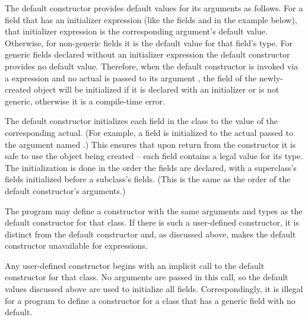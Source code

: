 The default constructor provides default values for its arguments as follows.
For a field that has an initializer expression (like the
fields  and  in the example below), that initializer
expression is the corresponding argument's default value.
Otherwise, for non-generic fields it is the default value for that
field's type.
For generic fields declared without an initializer expression the
default constructor provides no default value.
Therefore, when the default constructor is invoked via a 
expression and no actual is passed to its argument , the
field  of the newly-created object will be initialized if it
is declared with an initializer or is not generic, otherwise it is a
compile-time error.

The default constructor initializes each field in the class to the
value of the corresponding actual. (For example, a field  is
initialized to the actual passed to the argument named .)
This ensures that upon return from the constructor it is safe to use
the object being created -- each field contains a legal value for its type.
The initialization is done in the order the fields are declared, with
a superclass's fields initialized before a subclass's fields.
(This is the same as the order of the default constructor's arguments.)

The program may define a constructor with the same arguments and types
as the default constructor for that class. If there is such a
user-defined constructor, it is distinct from the default
constructor and, as discussed above, makes the default constructor
unavailable for  expressions.

Any user-defined constructor begins with an implicit call to the
default constructor for that class. No arguments are passed in this
call, so the default values discussed above are used to initialize all
fields. Correspondingly, it is illegal for a program to define a
constructor for a class that has a generic field with no default.

